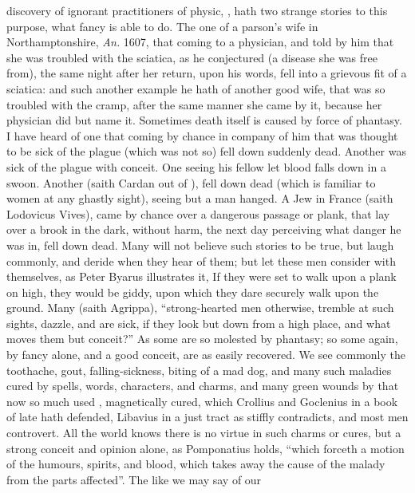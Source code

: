 discovery of ignorant practitioners of physic, ,
hath two strange stories to this purpose, what fancy is able to do. The one of
a parson's wife in Northamptonshire, \emph{An.} 1607, that coming to a
physician, and told by him that she was troubled with the sciatica, as he
conjectured (a disease she was free from), the same night after her return,
upon his words, fell into a grievous fit of a sciatica: and such another
example he hath of another good wife, that was so troubled with the cramp,
after the same manner she came by it, because her physician did but name it.
Sometimes death itself is caused by force of phantasy. I have heard of one that
coming by chance in company of him that was thought to be sick of the plague
(which was not so) fell down suddenly dead. Another was sick of the plague with
conceit. One seeing his fellow let blood falls down in a swoon. Another (saith
Cardan out of \Aristotle{}), fell down dead (which is
familiar to women at any ghastly sight), seeing but a man hanged. A Jew in
France (saith Lodovicus Vives), came by chance over a
dangerous passage or plank, that lay over a brook in the dark, without harm,
the next day perceiving what danger he was in, fell down dead. Many will not
believe such stories to be true, but laugh commonly, and deride when they hear
of them; but let these men consider with themselves, as
Peter Byarus illustrates it, If they were set to walk upon
a plank on high, they would be giddy, upon which they dare securely walk upon
the ground. Many (saith Agrippa), \enquote{strong-hearted men
otherwise, tremble at such sights, dazzle, and are sick, if they look but down
from a high place, and what moves them but conceit?} As some are so molested by
phantasy; so some again, by fancy alone, and a good conceit, are as easily
recovered. We see commonly the toothache, gout, falling-sickness, biting of a
mad dog, and many such maladies cured by spells, words, characters, and charms,
and many green wounds by that now so much used ,
magnetically cured, which Crollius and Goclenius in a book of late hath
defended, Libavius in a just tract as stiffly contradicts, and most men
controvert. All the world knows there is no virtue in such charms or cures, but
a strong conceit and opinion alone, as Pomponatius holds,
\enquote{which forceth a motion of the humours, spirits, and blood, which takes away
the cause of the malady from the parts affected}. The like we may say of our
